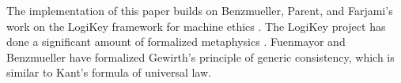 \begin{isabellebody}
\begin{isamarkuptext}
The implementation of this paper builds on Benzmueller, Parent, and Farjami's work 
on the LogiKey framework for machine ethics \cite{BFP, logikey}. The LogiKey project has done a significant 
amount of formalized metaphysics \cite{godel, metaphysics1}. Fuenmayor and Benzmueller \cite{gewirth} have 
formalized Gewirth's principle of generic consistency, which is similar to Kant's formula of universal law.%
\end{isamarkuptext}\isamarkuptrue%
%
\isadelimtheory
%
\endisadelimtheory
%
\isatagtheory
%
\endisatagtheory
{\isafoldtheory}%
%
\isadelimtheory
%
\endisadelimtheory
%
\end{isabellebody}%
\endinput
